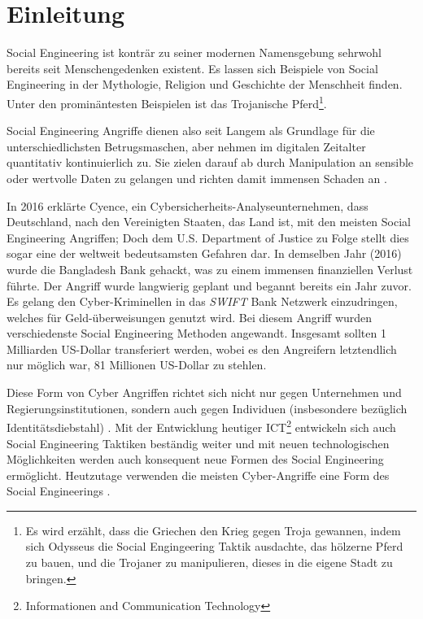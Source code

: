 \chapter{Einleitung}
\label{chapter:einleitung}

Social Engineering ist konträr zu seiner modernen Namensgebung sehrwohl bereits seit
Menschengedenken existent. Es lassen sich Beispiele von Social Engineering in der Mythologie,
Religion und Geschichte der Menschheit finden.
Unter den prominäntesten Beispielen ist das Trojanische Pferd\footnote{Es wird erzählt, dass
die Griechen den Krieg gegen Troja gewannen,
indem sich Odysseus die Social Engingeering Taktik ausdachte, das hölzerne Pferd zu bauen,
und die Trojaner zu manipulieren, dieses in die eigene Stadt zu bringen.}.

Social Engineering Angriffe dienen also seit Langem als Grundlage für die unterschiedlichsten Betrugsmaschen,
aber nehmen im digitalen Zeitalter quantitativ kontinuierlich zu.
Sie zielen darauf ab durch Manipulation an sensible oder wertvolle Daten zu gelangen
und richten damit immensen Schaden an .

In 2016 erklärte Cyence, ein Cybersicherheits-Analyseunternehmen, dass Deutschland, nach den Vereinigten Staaten,
das Land ist, mit den meisten Social Engineering Angriffen; Doch dem U.S. Department of Justice zu Folge stellt
dies sogar eine der weltweit bedeutsamsten Gefahren dar.
In demselben Jahr (2016) wurde die Bangladesh Bank gehackt, was zu einem immensen finanziellen Verlust führte.
Der Angriff wurde langwierig geplant und begannt bereits ein Jahr zuvor.
Es gelang den Cyber-Kriminellen in das \textit{SWIFT} Bank Netzwerk einzudringen, welches für Geld-überweisungen
genutzt wird. Bei diesem Angriff wurden verschiedenste Social Engineering Methoden angewandt.
Insgesamt sollten 1 Milliarden US-Dollar transferiert werden, wobei es den Angreifern
letztendlich nur möglich war, 81 Millionen US-Dollar zu stehlen.

Diese Form von Cyber Angriffen richtet sich nicht nur gegen Unternehmen und Regierungsinstitutionen,
sondern auch gegen Individuen (insbesondere bezüglich Identitätsdiebstahl) .
Mit der Entwicklung heutiger ICT\footnote{Informationen and Communication Technology} entwickeln sich auch
Social Engineering Taktiken beständig weiter und mit neuen technologischen Möglichkeiten werden auch
konsequent neue Formen des Social Engineering ermöglicht. Heutzutage verwenden die meisten
Cyber-Angriffe eine Form des Social Engineerings .

